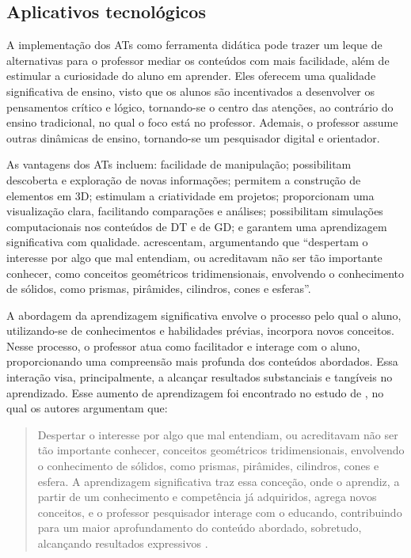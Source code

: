 \subsection{Aplicativos tecnológicos}\label{sub-sec-aplicativostecnologicos}

A implementação dos ATs como ferramenta didática pode trazer um leque de
alternativas para o professor mediar os conteúdos com mais facilidade,
além de estimular a curiosidade do aluno em aprender. Eles oferecem uma
qualidade significativa de ensino, visto que os alunos são incentivados
a desenvolver os pensamentos crítico e lógico, tornando-se o centro das
atenções, ao contrário do ensino tradicional, no qual o foco está no
professor. Ademais, o professor assume outras dinâmicas de ensino,
tornando-se um pesquisador digital e orientador.

As vantagens dos ATs incluem: facilidade de manipulação; possibilitam
descoberta e exploração de novas informações; permitem a construção de
elementos em 3D; estimulam a criatividade em projetos; proporcionam uma
visualização clara, facilitando comparações e análises; possibilitam
simulações computacionais nos conteúdos de DT e de GD; e garantem uma
aprendizagem significativa com qualidade. \textcite[p. 212]{silva2017}
acrescentam, argumentando que \enquote{despertam o interesse por algo que mal
	entendiam, ou acreditavam não ser tão importante conhecer, como
	conceitos geométricos tridimensionais, envolvendo o conhecimento de
	sólidos, como prismas, pirâmides, cilindros, cones e esferas}.

A abordagem da aprendizagem significativa envolve o processo pelo qual o
aluno, utilizando-se de conhecimentos e habilidades prévias, incorpora
novos conceitos. Nesse processo, o professor atua como facilitador e
interage com o aluno, proporcionando uma compreensão mais profunda dos
conteúdos abordados. Essa interação visa, principalmente, a alcançar
resultados substanciais e tangíveis no aprendizado. Esse aumento de
aprendizagem foi encontrado no estudo de \textcite{silva2017}, no qual
os autores argumentam que:

\begin{quote}
	Despertar o interesse por algo que mal entendiam, ou acreditavam não ser
	tão importante conhecer, conceitos geométricos tridimensionais,
	envolvendo o conhecimento de sólidos, como prismas, pirâmides,
	cilindros, cones e esfera. A aprendizagem significativa traz essa
	conceção, onde o aprendiz, a partir de um conhecimento e competência já
	adquiridos, agrega novos conceitos, e o professor pesquisador interage
	com o educando, contribuindo para um maior aprofundamento do conteúdo
	abordado, sobretudo, alcançando resultados expressivos \cite[p. 212]{silva2017}.
\end{quote}

